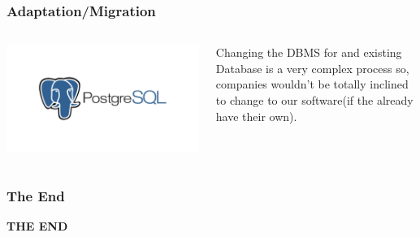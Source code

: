 \documentclass{beamer}
\begin{document}
\begin{frame}
	\frametitle{Adaptation/Migration}
	\begin{columns}
	\begin{column}{0.4\textwidth}
		\includegraphics[width=1.4\columnwidth]{postgelogo.png}
	\end{column}
		\begin{column}{0.4\textwidth}
	Changing the DBMS for and existing Database is a very complex process so, companies wouldn't be totally inclined to change to our software(if the already have their own).	
	\end{column}
		\end{columns}
\end{frame}

\begin{frame}
	\frametitle{The End}
	\begin{center}
		\Huge\textbf{THE END} 
	\end{center} 
\end{frame}
\end{document}
